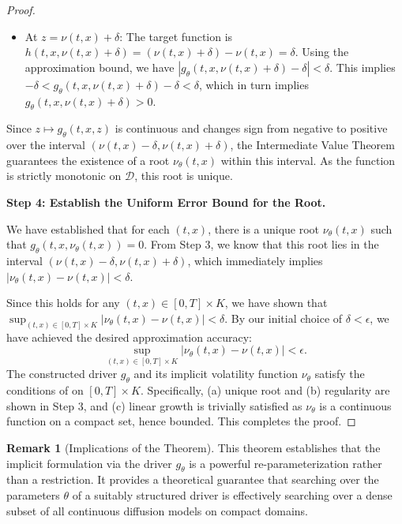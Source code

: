 \documentclass[qian]{imsart}
\newcommand{\abs}[1]{\left\lvert#1\right\rvert}
\theoremstyle{plain}
\theoremstyle{definition}
\newtheorem{remark}[theorem]{Remark}
\begin{document}
\begin{proof}
\begin{itemize}
    \item At $z = \nu(t,x) + \delta$:
    The target function is $h(t,x, \nu(t,x) + \delta) = (\nu(t,x)+\delta) - \nu(t,x) = \delta$.
    Using the approximation bound, we have $\abs{g_\theta(t,x, \nu(t,x)+\delta) - \delta} < \delta$. This implies $-\delta < g_\theta(t,x, \nu(t,x)+\delta) - \delta < \delta$, which in turn implies $g_\theta(t,x, \nu(t,x)+\delta) > 0$.
\end{itemize}
Since $z \mapsto g_\theta(t,x,z)$ is continuous and changes sign from negative to positive over the interval $(\nu(t,x) - \delta, \nu(t,x) + \delta)$, the Intermediate Value Theorem guarantees the existence of a root $\nu_\theta(t,x)$ within this interval. As the function is strictly monotonic on $\mathcal{D}$, this root is unique.

\textbf{Step 4: Establish the Uniform Error Bound for the Root.}

We have established that for each $(t,x)$, there is a unique root $\nu_\theta(t,x)$ such that $g_\theta(t,x, \nu_\theta(t,x)) = 0$.
From Step 3, we know that this root lies in the interval $(\nu(t,x)-\delta, \nu(t,x)+\delta)$, which immediately implies $\abs{\nu_\theta(t,x) - \nu(t,x)} < \delta$.

Since this holds for any $(t,x) \in [0,T] \times K$, we have shown that $\sup_{(t,x) \in [0,T] \times K} \abs{\nu_\theta(t,x) - \nu(t,x)} < \delta$.
By our initial choice of $\delta < \epsilon$, we have achieved the desired approximation accuracy:
\[
\sup_{(t,x) \in [0,T] \times K} \abs{\nu_\theta(t,x) - \nu(t,x)} < \epsilon.
\]
The constructed driver $g_\theta$ and its implicit volatility function $\nu_\theta$ satisfy the conditions of  on $[0,T] \times K$. Specifically, (a) unique root and (b) regularity are shown in Step 3, and (c) linear growth is trivially satisfied as $\nu_\theta$ is a continuous function on a compact set, hence bounded. This completes the proof.
\end{proof}

\begin{remark}[Implications of the Theorem]
This theorem establishes that the implicit formulation via the driver $g_\theta$ is a powerful re-parameterization rather than a restriction. It provides a theoretical guarantee that searching over the parameters $\theta$ of a suitably structured driver is effectively searching over a dense subset of all continuous diffusion models on compact domains.
\end{remark}
\end{document}
